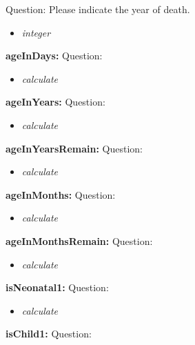 \documentclass{article}%
\begin{document}
Question: Please indicate the year of death.\newline%
%
\begin{itemize}%
\item%
\textit{integer\newline%
}%
\end{itemize}%
\textbf{ageInDays: \newline%
}%
Question: \newline%
%
\begin{itemize}%
\item%
\textit{calculate\newline%
}%
\end{itemize}%
\textbf{ageInYears: \newline%
}%
Question: \newline%
%
\begin{itemize}%
\item%
\textit{calculate\newline%
}%
\end{itemize}%
\textbf{ageInYearsRemain: \newline%
}%
Question: \newline%
%
\begin{itemize}%
\item%
\textit{calculate\newline%
}%
\end{itemize}%
\textbf{ageInMonths: \newline%
}%
Question: \newline%
%
\begin{itemize}%
\item%
\textit{calculate\newline%
}%
\end{itemize}%
\textbf{ageInMonthsRemain: \newline%
}%
Question: \newline%
%
\begin{itemize}%
\item%
\textit{calculate\newline%
}%
\end{itemize}%
\textbf{isNeonatal1: \newline%
}%
Question: \newline%
%
\begin{itemize}%
\item%
\textit{calculate\newline%
}%
\end{itemize}%
\textbf{isChild1: \newline%
}%
Question: \newline%
\end{document}
